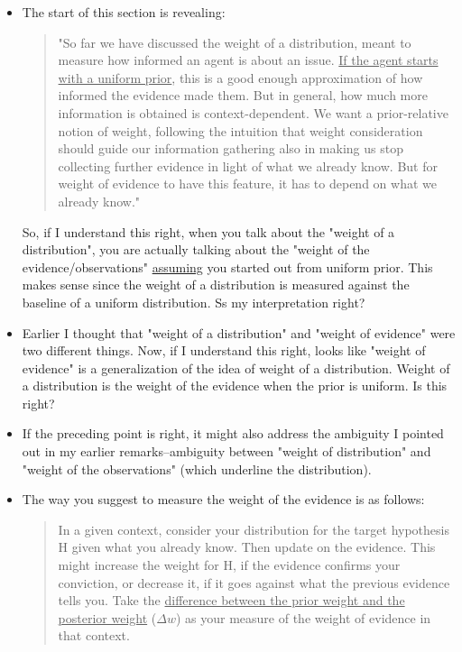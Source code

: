 \documentclass[
  10pt,
  dvipsnames,enabledeprecatedfontcommands]{scrartcl}
\begin{document}
\begin{itemize}

\item The start of this section is revealing:

\begin{quote}
"So far we have discussed the weight of a distribution, meant to measure how informed an agent is about an issue. \underline{If the agent starts with a uniform prior}, this is a good enough approximation of how informed the evidence made them. But in general, how much more information is obtained is context-dependent. We want a prior-relative notion of weight, following the intuition that weight consideration should guide our information gathering also in making us stop collecting further evidence in light of what we already know. But for weight of evidence to have this feature, it has to depend on what we already know."
\end{quote}

So, if I understand this right, when you talk about the "weight of a distribution", you are actually talking about the "weight of the evidence/observations" \underline{assuming} you started out from uniform prior. This makes sense since the weight of a distribution is measured against the baseline of a uniform distribution. Ss my interpretation right?


\item Earlier I thought that "weight of a distribution" and "weight of evidence" were two different things.
Now, if I understand this right, looks like "weight of evidence" is a generalization of the 
idea of weight of a distribution. Weight of a distribution is the weight of the 
evidence when the prior is uniform. Is this right?

\item If the preceding point is right, it might also address the ambiguity I pointed out in my earlier remarks--ambiguity between "weight of distribution" and "weight of the observations" (which underline the distribution).

\item The way you suggest to measure the weight of the evidence is as follows:

\begin{quote}
In a given context, consider your distribution for the target hypothesis H given what you already know. Then update on the evidence. This might increase the weight for H, if the evidence confirms your conviction, or decrease it, if it goes against what the previous evidence tells you. Take the \underline{difference between the prior weight and the posterior weight} ($\Delta w$) as your measure of the weight of evidence in that context. 
\end{quote}


\end{itemize}
\end{document}

